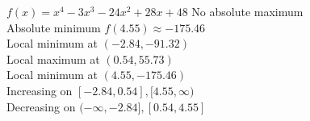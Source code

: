 {$f(x) = x^{4} - 3x^{3} - 24x^{2} + 28x + 48$}
{No absolute maximum \\
Absolute minimum $f(4.55) \approx -175.46$ \\
Local minimum at $(-2.84, -91.32)$\\
Local maximum at $(0.54, 55.73)$ \\
Local minimum at $(4.55, -175.46)$\\
Increasing on $[-2.84, 0.54], [4.55, \infty)$\\
Decreasing on $(-\infty, -2.84], [0.54, 4.55]$}